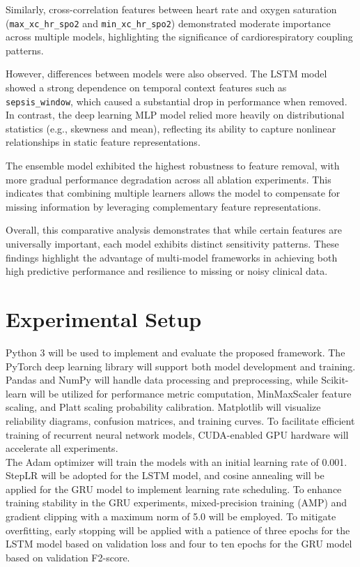 \documentclass[conference]{IEEEtran}
\begin{document}
Similarly, cross-correlation features between heart rate and oxygen saturation (\texttt{max\_xc\_hr\_spo2} and \texttt{min\_xc\_hr\_spo2}) demonstrated moderate importance across multiple models, highlighting the significance of cardiorespiratory coupling patterns.

However, differences between models were also observed. The LSTM model showed a strong dependence on temporal context features such as \texttt{sepsis\_window}, which caused a substantial drop in performance when removed. In contrast, the deep learning MLP model relied more heavily on distributional statistics (e.g., skewness and mean), reflecting its ability to capture nonlinear relationships in static feature representations.

The ensemble model exhibited the highest robustness to feature removal, with more gradual performance degradation across all ablation experiments. This indicates that combining multiple learners allows the model to compensate for missing information by leveraging complementary feature representations.

Overall, this comparative analysis demonstrates that while certain features are universally important, each model exhibits distinct sensitivity patterns. These findings highlight the advantage of multi-model frameworks in achieving both high predictive performance and resilience to missing or noisy clinical data.



\section{Experimental Setup}
Python 3 will be used to implement and evaluate the proposed framework. The PyTorch deep learning library will support both model development and training. Pandas and NumPy will handle data processing and preprocessing, while Scikit-learn will be utilized for performance metric computation, MinMaxScaler feature scaling, and Platt scaling probability calibration. Matplotlib will visualize reliability diagrams, confusion matrices, and training curves. To facilitate efficient training of recurrent neural network models, CUDA-enabled GPU hardware will accelerate all experiments.\\

The Adam optimizer will train the models with an initial learning rate of 0.001. StepLR will be adopted for the LSTM model, and cosine annealing will be applied for the GRU model to implement learning rate scheduling. To enhance training stability in the GRU experiments, mixed-precision training (AMP) and gradient clipping with a maximum norm of 5.0 will be employed. To mitigate overfitting, early stopping will be applied with a patience of three epochs for the LSTM model based on validation loss and four to ten epochs for the GRU model based on validation F2-score.
\end{document}
